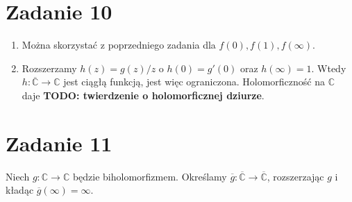 \section*{Zadanie 10}

\begin{enumerate}
    \item Można skorzystać z poprzedniego zadania dla \( f(0), f(1), f(\infty) \).

    \item Rozszerzamy \( h(z) = g(z)/z \) o \( h(0) = g'(0) \) oraz \( h(\infty) = 1 \). Wtedy \( h: \overline{\mathbb{C}} \to \mathbb{C} \) jest ciągłą funkcją, jest więc ograniczona. Holomorficzność na \( \mathbb{C} \) daje \textbf{TODO: twierdzenie o holomorficznej dziurze}.
\end{enumerate}

\section*{Zadanie 11}

Niech \( g: \mathbb{C} \to \mathbb{C} \) będzie biholomorfizmem. Określamy \( \overline{g}: \overline{ \mathbb{C} } \to \overline{ \mathbb{C} } \), rozszerzając \( g \) i kładąc \( \overline{g}(\infty) = \infty \).
